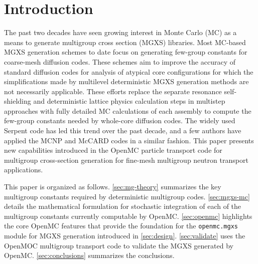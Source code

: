 \section{Introduction}
\label{sec:intro}

The past two decades have seen growing interest in Monte Carlo (MC) as a means to generate multigroup cross section (MGXS) libraries. Most MC-based MGXS generation schemes to date focus on generating few-group constants for coarse-mesh diffusion codes. These schemes aim to improve the accuracy of standard diffusion codes for analysis of atypical core configurations for which the simplifications made by multilevel deterministic MGXS generation methods are not necessarily applicable. These efforts replace the separate resonance self-shielding and deterministic lattice physics calculation steps in multistep approaches with fully detailed MC calculations of each assembly to compute the few-group constants needed by whole-core diffusion codes. The widely used Serpent code\cite{leppanen2015serpent} has led this trend over the past decade, and a few authors have applied the MCNP\cite{pounders2006stochastically} and McCARD\cite{shim2008generation} codes in a similar fashion. This paper presents new capabilities introduced in the OpenMC\cite{romano2015openmc} particle transport code for multigroup cross-section generation for fine-mesh multigroup neutron transport applications.

This paper is organized as follows. \cref{sec:mg-theory} summarizes the key multigroup constants required by deterministic multigroup codes. \cref{sec:mgxs-mc} details the mathematical formulation for stochastic integration of each of the multigroup constants currently computable by OpenMC. \cref{sec:openmc} highlights the core OpenMC features that provide the foundation for the \texttt{openmc.mgxs} module for MGXS generation introduced in \cref{sec:design}. \cref{sec:validate} uses the OpenMOC\cite{boyd2014openmoc} multigroup transport code to validate the MGXS generated by OpenMC. \cref{sec:conclusions} summarizes the conclusions.
